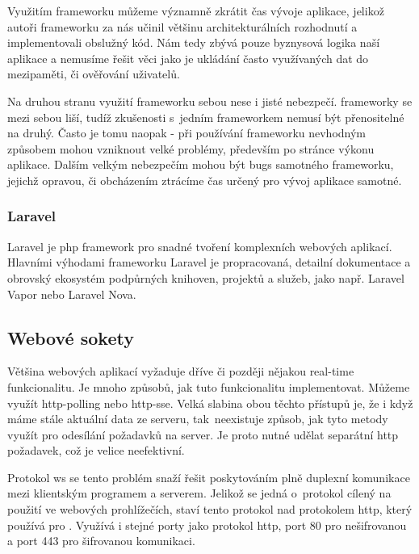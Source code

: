 Využitím \gls{framework}u můžeme významně zkrátit čas vývoje aplikace, jelikož autoři \gls{framework}u za nás učinil většinu architekturálních rozhodnutí a implementovali obslužný kód. Nám tedy zbývá pouze byznysová logika naší aplikace a nemusíme řešit věci jako je ukládání často využívaných dat do mezipaměti, či ověřování uživatelů.

Na druhou stranu využití \gls{framework}u sebou nese i jisté nebezpečí. \Gls{framework}y se mezi sebou liší, tudíž zkušenosti s~jedním \gls{framework}em nemusí být přenositelné na druhý. Často je tomu naopak - při používání \gls{framework}u nevhodným způsobem mohou vzniknout velké problémy, především po stránce výkonu aplikace. Dalším velkým nebezpečím mohou být \glspl{bug} samotného \gls{framework}u, jejichž opravou, či obcházením ztrácíme čas určený pro vývoj aplikace samotné.

\subsubsection{Laravel}
\label{subsub:laravel}

Laravel\cite{laravel} je \acrshort{php} \gls{framework} pro snadné tvoření komplexních webových aplikací. Hlavními výhodami \gls{framework}u Laravel je propracovaná, detailní dokumentace a obrovský ekosystém podpůrných knihoven, projektů a služeb, jako např. Laravel Vapor\cite{laravel-vapor} nebo Laravel Nova\cite{laravel-nova}.

\subsection{Webové sokety}

Většina webových aplikací vyžaduje dříve či později nějakou \gls{real-time} funkcionalitu. Je mnoho způsobů, jak tuto funkcionalitu implementovat. Můžeme využít \Gls{http-polling}\cite{http-polling} nebo \Gls{http-sse}\cite{http-sse}. Velká slabina obou těchto přístupů je, že i když máme stále aktuální data ze serveru, tak~neexistuje způsob, jak tyto metody využít pro odesílání požadavků na server. Je proto nutné udělat separátní \acrshort{http} požadavek, což je velice neefektivní.

Protokol \acrfull{ws}\cite{ws} se tento problém snaží řešit poskytováním plně duplexní komunikace mezi klientským programem a serverem. Jelikož se jedná o~protokol cílený na použití ve webových prohlížečích, staví tento protokol nad protokolem \acrshort{http}, který používá pro . Využívá i stejné porty jako protokol \acrshort{http}, port 80 pro nešifrovanou a port 443 pro šifrovanou komunikaci.

